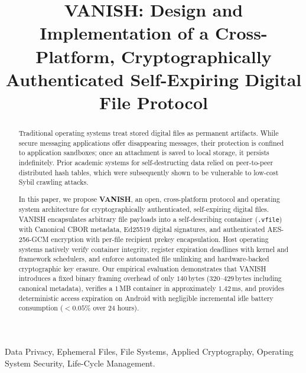\documentclass[conference]{IEEEtran}
\begin{document}
\title{VANISH: Design and Implementation of a Cross-Platform, Cryptographically Authenticated Self-Expiring Digital File Protocol}

\author{
}

\maketitle

\begin{abstract}
Traditional operating systems treat stored digital files as permanent artifacts. While secure messaging applications offer disappearing messages, their protection is confined to application sandboxes; once an attachment is saved to local storage, it persists indefinitely. Prior academic systems for self-destructing data relied on peer-to-peer distributed hash tables, which were subsequently shown to be vulnerable to low-cost Sybil crawling attacks.

In this paper, we propose \textbf{VANISH}, an open, cross-platform protocol and operating system architecture for cryptographically authenticated, self-expiring digital files. VANISH encapsulates arbitrary file payloads into a self-describing container (\texttt{.vfile}) with Canonical CBOR metadata, Ed25519 digital signatures, and authenticated AES-256-GCM encryption with per-file recipient prekey encapsulation. Host operating systems natively verify container integrity, register expiration deadlines with kernel and framework schedulers, and enforce automated file unlinking and hardware-backed cryptographic key erasure. Our empirical evaluation demonstrates that VANISH introduces a fixed binary framing overhead of only $140$\,bytes ($320$--$429$\,bytes including canonical metadata), verifies a $1$\,MB container in approximately $1.42$\,ms, and provides deterministic access expiration on Android with negligible incremental idle battery consumption ($<0.05\%$ over 24 hours).
\end{abstract}

\begin{IEEEkeywords}
Data Privacy, Ephemeral Files, File Systems, Applied Cryptography, Operating System Security, Life-Cycle Management.
\end{IEEEkeywords}








\end{document}
